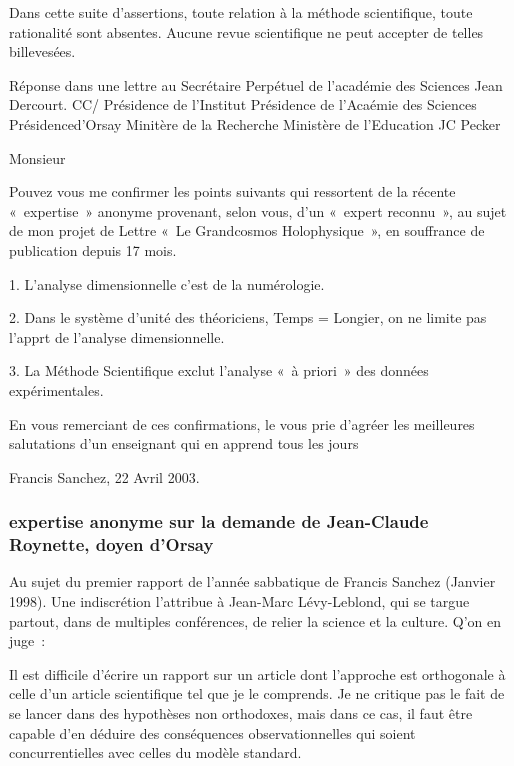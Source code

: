 \documentclass[a4paper,12pt]{article}
\begin{document}
Dans cette suite d’assertions, toute relation à la méthode scientifique, toute rationalité sont absentes. Aucune revue scientifique ne peut accepter de telles billevesées.



Réponse dans une lettre au Secrétaire Perpétuel de l’académie des Sciences Jean Dercourt.
CC/ Présidence de l’Institut
Présidence de l’Acaémie des Sciences
Présidenced’Orsay
Minitère de la Recherche
Ministère de l’Education
JC Pecker

Monsieur

Pouvez vous me confirmer les points suivants qui ressortent de la récente « expertise » anonyme provenant, selon vous, d’un « expert reconnu », au sujet de mon projet de Lettre « Le Grandcosmos Holophysique », en souffrance de publication depuis 17 mois.

1. L’analyse dimensionnelle c’est de la numérologie.

2. Dans le système d’unité des théoriciens,  Temps = Longier, on ne limite pas l’apprt de l’analyse dimensionnelle.

3. La Méthode Scientifique exclut l’analyse « à priori » des données expérimentales.

En vous remerciant de ces confirmations, le vous prie d’agréer les meilleures salutations d’un enseignant qui en apprend tous les jours

Francis Sanchez, 22 Avril 2003.


\subsubsection{expertise anonyme sur la demande de Jean-Claude Roynette, doyen d’Orsay} 

Au sujet du premier rapport de l’année sabbatique de Francis Sanchez (Janvier 1998). Une indiscrétion l’attribue à Jean-Marc Lévy-Leblond, qui se targue partout, dans de multiples conférences, de relier la science et la culture. Q’on en juge :

Il est difficile d’écrire un rapport sur un article dont l’approche est orthogonale à celle d’un article scientifique tel que je le comprends. Je ne critique pas le fait de se lancer dans des hypothèses non orthodoxes, mais dans ce cas, il faut être capable d’en déduire des conséquences observationnelles qui soient concurrentielles avec celles du modèle standard.
\end{document}
